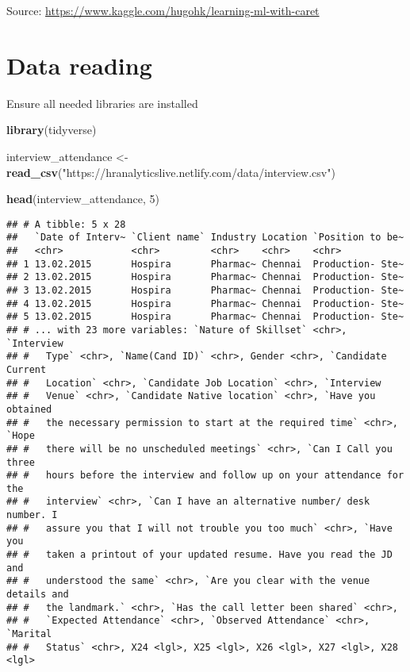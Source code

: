 \documentclass[12pt, krantz2,]{krantz}
\makeatletter
\newenvironment{Shaded}{\begin{snugshade}}{\end{snugshade}}
\newcommand{\DecValTok}[1]{\textcolor[rgb]{0.06,0.06,0.06}{#1}}
\newcommand{\KeywordTok}[1]{\textcolor[rgb]{0.27,0.27,0.27}{\textbf{#1}}}
\newcommand{\NormalTok}[1]{#1}
\newcommand{\StringTok}[1]{\textcolor[rgb]{0.5,0.5,0.5}{#1}}
\newenvironment{kframe}{%
\medskip{}
\setlength{\fboxsep}{.8em}
 \def\at@end@of@kframe{}%
 \ifinner\ifhmode%
  \def\at@end@of@kframe{\end{minipage}}%
  \begin{minipage}{\columnwidth}%
 \fi\fi%
 \def\FrameCommand##1{\hskip\@totalleftmargin \hskip-\fboxsep
 \colorbox{shadecolor}{##1}\hskip-\fboxsep
     \hskip-\linewidth \hskip-\@totalleftmargin \hskip\columnwidth}%
 \MakeFramed {\advance\hsize-\width
   \@totalleftmargin\z@ \linewidth\hsize
   \@setminipage}}%
 {\par\unskip\endMakeFramed%
 \at@end@of@kframe}
\renewenvironment{Shaded}{\begin{kframe}}{\end{kframe}}
\makeatother
\begin{document}
Source: \url{https://www.kaggle.com/hugohk/learning-ml-with-caret}

\hypertarget{data-reading-1}{%
\section{Data reading}\label{data-reading-1}}

Ensure all needed libraries are installed

\begin{Shaded}
\begin{Highlighting}[]
\KeywordTok{library}\NormalTok{(tidyverse)}
\end{Highlighting}
\end{Shaded}

\begin{Shaded}
\begin{Highlighting}[]
\NormalTok{interview_attendance <-}\StringTok{ }\KeywordTok{read_csv}\NormalTok{(}\StringTok{"https://hranalyticslive.netlify.com/data/interview.csv"}\NormalTok{)}
\end{Highlighting}
\end{Shaded}

\begin{Shaded}
\begin{Highlighting}[]
\KeywordTok{head}\NormalTok{(interview_attendance, }\DecValTok{5}\NormalTok{)}
\end{Highlighting}
\end{Shaded}

\begin{verbatim}
## # A tibble: 5 x 28
##   `Date of Interv~ `Client name` Industry Location `Position to be~
##   <chr>            <chr>         <chr>    <chr>    <chr>           
## 1 13.02.2015       Hospira       Pharmac~ Chennai  Production- Ste~
## 2 13.02.2015       Hospira       Pharmac~ Chennai  Production- Ste~
## 3 13.02.2015       Hospira       Pharmac~ Chennai  Production- Ste~
## 4 13.02.2015       Hospira       Pharmac~ Chennai  Production- Ste~
## 5 13.02.2015       Hospira       Pharmac~ Chennai  Production- Ste~
## # ... with 23 more variables: `Nature of Skillset` <chr>, `Interview
## #   Type` <chr>, `Name(Cand ID)` <chr>, Gender <chr>, `Candidate Current
## #   Location` <chr>, `Candidate Job Location` <chr>, `Interview
## #   Venue` <chr>, `Candidate Native location` <chr>, `Have you obtained
## #   the necessary permission to start at the required time` <chr>, `Hope
## #   there will be no unscheduled meetings` <chr>, `Can I Call you three
## #   hours before the interview and follow up on your attendance for the
## #   interview` <chr>, `Can I have an alternative number/ desk number. I
## #   assure you that I will not trouble you too much` <chr>, `Have you
## #   taken a printout of your updated resume. Have you read the JD and
## #   understood the same` <chr>, `Are you clear with the venue details and
## #   the landmark.` <chr>, `Has the call letter been shared` <chr>,
## #   `Expected Attendance` <chr>, `Observed Attendance` <chr>, `Marital
## #   Status` <chr>, X24 <lgl>, X25 <lgl>, X26 <lgl>, X27 <lgl>, X28 <lgl>
\end{verbatim}
\end{document}
